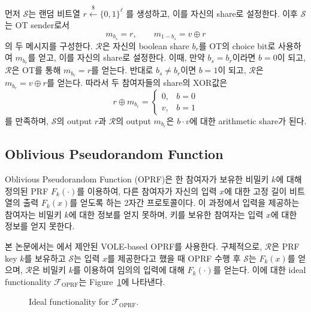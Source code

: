 \documentclass[sigconf,anonymous,review]{acmart}
\begin{document}
먼저 $\mathcal{S}$는 랜덤 비트열 $r\overset{\$}{\leftarrow}\{0,1\}^\ell$
를 생성하고, 이를 자신의 share로 설정한다. 이후 $\mathcal{S}$는
OT sender로서
\[
m_{b_s}=r,\qquad m_{1-b_s}=v \oplus r
\]
의 두 메시지를 구성한다. $\mathcal{R}$은 자신의 boolean share \(b_r\)를
OT의 choice bit로 사용하여 \(m_{b_r}\)를 얻고, 이를 자신의 share로 설정한다.
이때, 만약 \(b_s=b_r\)이라면 \(b=0\)이 되고, $\mathcal{R}$은
OT를 통해 \(m_{b_r}=r\)를 얻는다. 반대로 \(b_s\neq b_r\)이면
\(b=1\)이 되고, $\mathcal{R}$은 \(m_{b_r}=v \oplus r\)를 얻는다. 따라서 두 참여자들의
share의 XOR값은
\[
r \oplus m_{b_r}
=
\begin{cases}
0, & b=0\\
v, & b=1
\end{cases}
\]
를 만족하며, $\mathcal{S}$의 output $r$과 $\mathcal{R}$의 output \(m_{b_r}\)은 \(b\cdot v\)에 대한 arithmetic share가 된다.


\subsection{Oblivious Pseudorandom Function}\label{sec:oprf}
Oblivious Pseudorandom Function (OPRF)은 한 참여자가 보유한
비밀키 $k$에 대해 정의된 PRF $F_k(\cdot)$를 이용하여,
다른 참여자가 자신의 입력 $x$에 대한 고정 길이 비트열의 출력 $F_k(x)$를 얻도록 하는
2자간 프로토콜이다. 이 과정에서 입력을 제공하는 참여자는
비밀키 $k$에 대한 정보를 얻지 못하며, 키를 보유한 참여자는
입력 $x$에 대한 정보를 얻지 못한다.

본 논문에서는 \cite{RS21}에서 제안된 VOLE-based OPRF를 사용한다.
구체적으로, $\mathcal{R}$은 PRF key $k$를 보유하고
$\mathcal{S}$는 입력 $x$를 제공한다고 했을 때 OPRF 수행 후
$\mathcal{S}$는 $F_k(x)$를 얻으며, $\mathcal{R}$은 비밀키 $k$를
이용하여 임의의 입력에 대해 $F_k(\cdot)$를 얻는다.
이에 대한 ideal functionality $\mathcal{F}_{\mathrm{OPRF}}$는
Figure~\ref{fig:oprf-ideal-functionality}에 나타낸다.

\begin{figure}[h]
\centering
{}
\caption{Ideal functionality for $\mathcal{F}_{\mathrm{OPRF}}$.}
\label{fig:oprf-ideal-functionality}
\end{figure}
\end{document}
